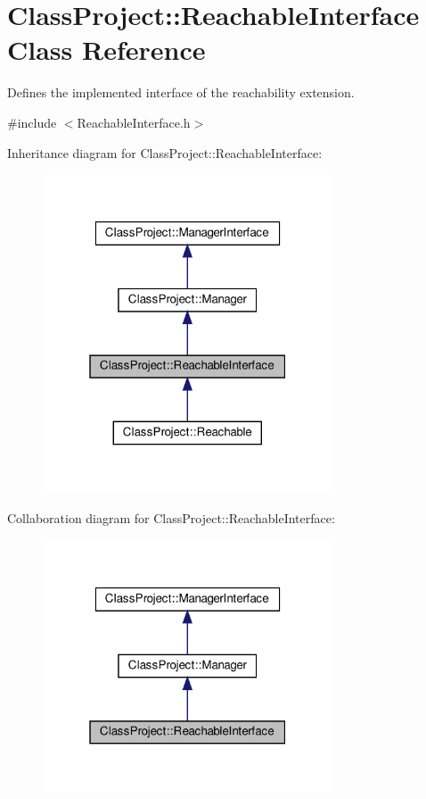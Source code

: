 \hypertarget{classClassProject_1_1ReachableInterface}{}\section{Class\+Project\+:\+:Reachable\+Interface Class Reference}
\label{classClassProject_1_1ReachableInterface}


Defines the implemented interface of the reachability extension.  




{\ttfamily \#include $<$Reachable\+Interface.\+h$>$}



Inheritance diagram for Class\+Project\+:\+:Reachable\+Interface\+:
\nopagebreak
\begin{figure}[H]
\begin{center}
\leavevmode
\includegraphics[width=244pt]{classClassProject_1_1ReachableInterface__inherit__graph}
\end{center}
\end{figure}


Collaboration diagram for Class\+Project\+:\+:Reachable\+Interface\+:
\nopagebreak
\begin{figure}[H]
\begin{center}
\leavevmode
\includegraphics[width=244pt]{classClassProject_1_1ReachableInterface__coll__graph}
\end{center}
\end{figure}

